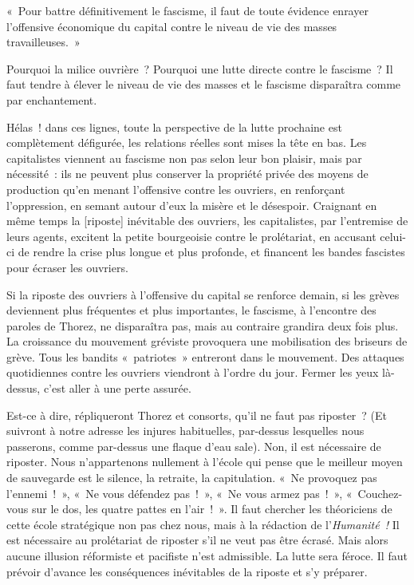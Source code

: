 \documentclass[french,twoside]{book} %
\newcommand\corr[1]{#1}
\newenvironment{quoteblock}%
  {\begin{quoting}}
  {\end{quoting}}
\newenvironment{quotebar}{%
    \def\FrameCommand{{\color{rubric!10!}\vrule width 0.5em} \hspace{0.9em}}%
    \def\OuterFrameSep{\itemsep} %
    \MakeFramed {\advance\hsize-\width \FrameRestore}
  }%
  {%
    \endMakeFramed
  }
\renewenvironment{quoteblock}%
  {%
    \savenotes
    \setstretch{0.9}
    \normalfont
    \begin{quotebar}
  }
  {%
    \end{quotebar}
    \spewnotes
  }
\begin{document}
\begin{quoteblock}
 \noindent « Pour battre définitivement le fascisme, il faut de toute évidence enrayer l’offensive économique du capital contre le niveau de vie des masses travailleuses. »
 \end{quoteblock}

\noindent Pourquoi la milice ouvrière ? Pourquoi une lutte directe contre le fascisme ? Il faut tendre à élever le niveau de vie des masses et le fascisme disparaîtra comme par enchantement.\par
Hélas ! dans ces lignes, toute la perspective de la lutte prochaine est complètement défigurée, les relations réelles sont mises la tête en bas. Les capitalistes viennent au fascisme non pas selon leur bon plaisir, mais par nécessité : ils ne peuvent plus conserver la propriété privée des moyens de production qu’en menant l’offensive contre les ouvriers, en renforçant l’oppression, en semant autour d’eux la misère et le désespoir. Craignant en même temps la [{\corr riposte}] inévitable des ouvriers, les capitalistes, par l’entremise de leurs agents, excitent la petite bourgeoisie contre le prolétariat, en accusant celui-ci de rendre la crise plus longue et plus profonde, et financent les bandes fascistes pour écraser les ouvriers.\par
Si la riposte des ouvriers à l’offensive du capital se renforce demain, si les grèves deviennent plus fréquentes et plus importantes, le fascisme, à l’encontre des paroles de Thorez, ne disparaîtra pas, mais au contraire grandira deux fois plus. La croissance du mouvement gréviste provoquera une mobilisation des briseurs de grève. Tous les bandits « patriotes » entreront dans le mouvement. Des attaques quotidiennes contre les ouvriers viendront à l’ordre  du jour. Fermer les yeux là-dessus, c’est aller à une perte assurée.\par
Est-ce à dire, répliqueront Thorez et consorts, qu’il ne faut pas riposter ? (Et suivront à notre adresse les injures habituelles, par-dessus lesquelles nous passerons, comme par-dessus une flaque d’eau sale). Non, il est nécessaire de riposter. Nous n’appartenons nullement à l’école qui pense que le meilleur moyen de sauvegarde est le silence, la retraite, la capitulation. « Ne provoquez pas l’ennemi ! », « Ne vous défendez pas ! », « Ne vous armez pas ! », « Couchez-vous sur le dos, les quatre pattes en l’air ! ». Il faut chercher les théoriciens de cette école stratégique non pas chez nous, mais à la rédaction de l’\emph{Humanité !} Il est nécessaire au prolétariat de riposter s’il ne veut pas être écrasé. Mais alors aucune illusion réformiste et pacifiste n’est admissible. La lutte sera féroce. Il faut prévoir d’avance les conséquences inévitables de la riposte et s’y préparer.\par
\end{document}
